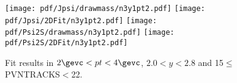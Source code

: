 \begin{figure}[H]
\begin{center}
\texttt{[image: pdf/Jpsi/drawmass/n3y1pt2.pdf]}
\texttt{[image: pdf/Jpsi/2DFit/n3y1pt2.pdf]}
\vspace*{-0.5cm}
\texttt{[image: pdf/Psi2S/drawmass/n3y1pt2.pdf]}
\texttt{[image: pdf/Psi2S/2DFit/n3y1pt2.pdf]}
\vspace*{-0.5cm}
\end{center}
\caption{Fit results in $2\gevc<pt<4\gevc$, $2.0<y<2.8$ and 15$\leq$PVNTRACKS$<$22.}
\label{Fitn3y1pt2}
\end{figure}
